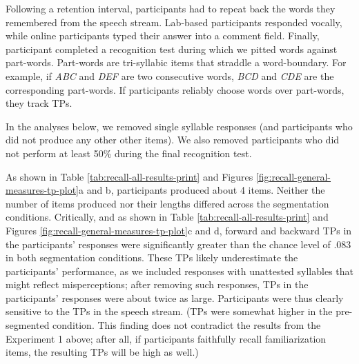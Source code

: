\documentclass[]{article}
\begin{document}
Following a retention interval, participants had to repeat back the words they remembered from the speech stream. Lab-based participants responded vocally, while online participants typed their answer into a comment field. Finally, participant completed a recognition test during which we pitted words against part-words. Part-words are tri-syllabic items that straddle a word-boundary. For example, if \emph{ABC} and \emph{DEF} are two consecutive words, \emph{BCD} and \emph{CDE} are the corresponding part-words. If participants reliably choose words over part-words, they track TPs.

In the analyses below, we removed single syllable responses (and participants who did not produce any other other items). We also removed participants who did not perform at least 50\% during the final recognition test.


As shown in Table \ref{tab:recall-all-results-print} and Figures \ref{fig:recall-general-measures-tp-plot}a and b, participants produced about 4 items. Neither the number of items produced nor their lengths differed across the segmentation conditions. Critically, and as shown in Table \ref{tab:recall-all-results-print} and Figures \ref{fig:recall-general-measures-tp-plot}c and d, forward and backward TPs in the participants' responses were significantly greater than the chance level of \(.083\) in both segmentation conditions. These TPs likely underestimate the participants' performance, as we included responses with unattested syllables that might reflect misperceptions; after removing such responses, TPs in the participants' responses were about twice as large. Participants were thus clearly sensitive to the TPs in the speech stream. (TPs were somewhat higher in the pre-segmented condition. This finding does not contradict the results from the Experiment 1 above; after all, if participants faithfully recall familiarization items, the resulting TPs will be high as well.)

\end{document}
